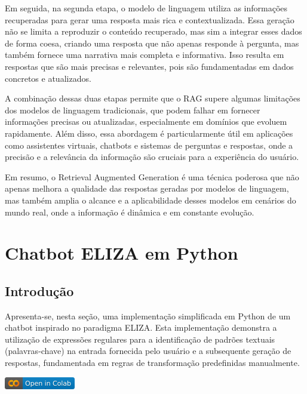 \documentclass[14pt,a4paper,oneside]{book}
\begin{document}
Em seguida, na segunda etapa, o modelo de linguagem utiliza as informações recuperadas para gerar uma resposta mais rica e contextualizada. Essa geração não se limita a reproduzir o conteúdo recuperado, mas sim a integrar esses dados de forma coesa, criando uma resposta que não apenas responde à pergunta, mas também fornece uma narrativa mais completa e informativa. Isso resulta em respostas que são mais precisas e relevantes, pois são fundamentadas em dados concretos e atualizados.

A combinação dessas duas etapas permite que o RAG supere algumas limitações dos modelos de linguagem tradicionais, que podem falhar em fornecer informações precisas ou atualizadas, especialmente em domínios que evoluem rapidamente. Além disso, essa abordagem é particularmente útil em aplicações como assistentes virtuais, chatbots e sistemas de perguntas e respostas, onde a precisão e a relevância da informação são cruciais para a experiência do usuário.

Em resumo, o Retrieval Augmented Generation é uma técnica poderosa que não apenas melhora a qualidade das respostas geradas por modelos de linguagem, mas também amplia o alcance e a aplicabilidade desses modelos em cenários do mundo real, onde a informação é dinâmica e em constante evolução.

\chapter{Chatbot ELIZA em Python}

\section{Introdução}

Apresenta-se, nesta seção, uma implementação simplificada em Python de um chatbot inspirado no paradigma ELIZA. Esta implementação demonstra a utilização de expressões regulares para a identificação de padrões textuais (palavras-chave) na entrada fornecida pelo usuário e a subsequente geração de respostas, fundamentada em regras de transformação predefinidas manualmente.

\vspace{\baselineskip}
\href{https://colab.research.google.com/github/giseldo/chatbotbook/blob/main/notebook/eliza.ipynb}{
  \includegraphics{./fig/colab-badge.png}
}
\end{document}
